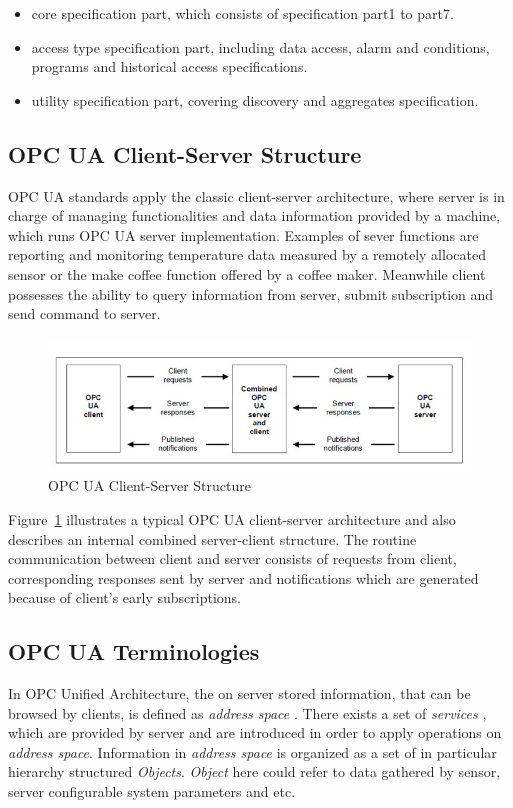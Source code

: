 \begin{itemize}
\item core specification part, which consists of specification part1 to part7.
\item access type specification part, including data access, alarm and conditions, programs and historical access specifications.
\item utility specification part, covering discovery and aggregates specification.
\end{itemize}


\subsection{OPC UA Client-Server Structure}
OPC UA standards apply the classic client-server architecture, where server is in charge of managing functionalities and data information provided by a machine, which runs OPC UA server implementation. Examples of sever functions are reporting and monitoring temperature data measured by a remotely allocated sensor or the make coffee function offered by a coffee maker. Meanwhile client possesses the ability to query information from server, submit subscription and send command to server.

\begin{figure}[!htbp]
	\centering
	\includegraphics[width=1.00\textwidth]{cs.jpg}
		\caption{OPC UA Client-Server Structure \cite{O1}}
	\label{fig:cs}
\end{figure}
Figure~\ref{fig:cs} illustrates a typical OPC UA client-server architecture and also describes an internal combined server-client structure. The routine communication between client and server consists of requests from client, corresponding responses sent by server and notifications which are generated because of client's early subscriptions.

\subsection{OPC UA Terminologies}
In OPC Unified Architecture, the on server stored information, that can be browsed by clients, is defined as \emph{address space} \cite{O3}. There exists a set of \emph{services} \cite{O4}, which are provided by server and are introduced in order to apply operations on \emph{address space}. Information in \emph{address space} is organized as a set of in particular hierarchy structured \emph{Objects}. \emph{Object} here could refer to data gathered by sensor, server configurable system parameters and etc. 

